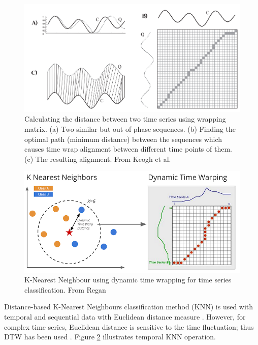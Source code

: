 \begin{figure}[!h]
    \centering
    \includegraphics[width=1\textwidth]{images/chapter2/DTWIlustration.png}
    \caption{Calculating the distance between two time series using wrapping matrix. 
        (a) Two similar but out of phase sequences. 
        (b) Finding the optimal path (minimum distance) between the sequences which causes time wrap alignment between different time points of them.
        (c) The resulting alignment.
        From Keogh et al. \cite{Keogh2005}}
    \label{fig:timewrapIllustration}
\end{figure}



\begin{figure}[!h]
    \includegraphics[scale=0.8]{images/chapter2/KNN_Temporal.png}
    \caption{K-Nearest Neighbour using dynamic time wrapping for time series classification. From Regan \cite{Regan2014}}
    \label{fig:KNN_Temporal}
\end{figure}

Distance-based K-Nearest Neighbours classification method (KNN) is used with temporal and sequential data with Euclidean distance measure \cite{Wei2006}. However, for complex time series, Euclidean distance is sensitive to the time fluctuation; thus DTW has been used \cite{KajanLaszl2006}. Figure \ref{fig:KNN_Temporal} illustrates temporal KNN operation.




